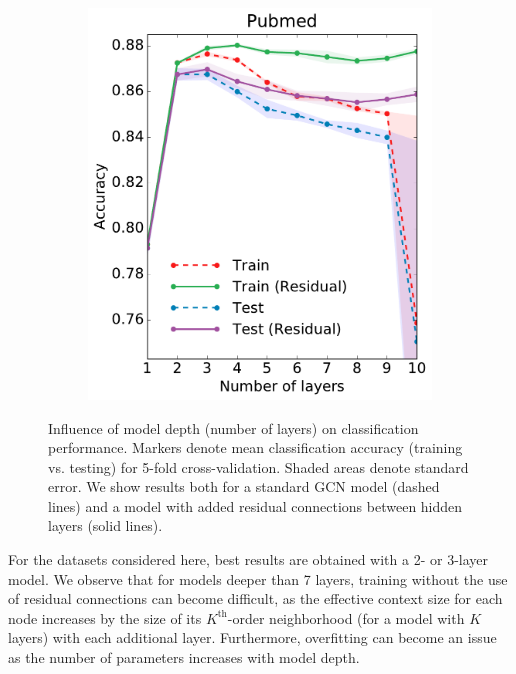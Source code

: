 \documentclass{article} %
\makeatletter
\newcommand*{\vs}{vs.\@\xspace}
\makeatother
\begin{document}
\begin{figure}[htbp]
\begin{subfigure}[b]{0.33\textwidth}
    \label{fig:model-depth-b}
\end{subfigure}%
~
\begin{subfigure}[b]{0.33\textwidth}
    \centering
    \includegraphics[width=\textwidth]{pubmed.pdf}
    \label{fig:model-depth-c}
\end{subfigure}%
\vspace{-1em}
\caption{Influence of model depth (number of layers) on classification performance. Markers denote mean classification accuracy (training \vs testing) for 5-fold cross-validation. Shaded areas denote standard error. We show results both for a standard GCN model (dashed lines) and a model with added residual connections \citep{he2015deep} between hidden layers (solid lines).}
\label{fig:model-depth}
\end{figure}

For the datasets considered here, best results are obtained with a 2- or 3-layer model. We observe that for models deeper than 7 layers, training without the use of residual connections can become difficult, as the effective context size for each node increases by the size of its $K^{\text{th}}$-order neighborhood (for a model with $K$ layers) with each additional layer. Furthermore, overfitting can become an issue as the number of parameters increases with model depth. %
\end{document}
